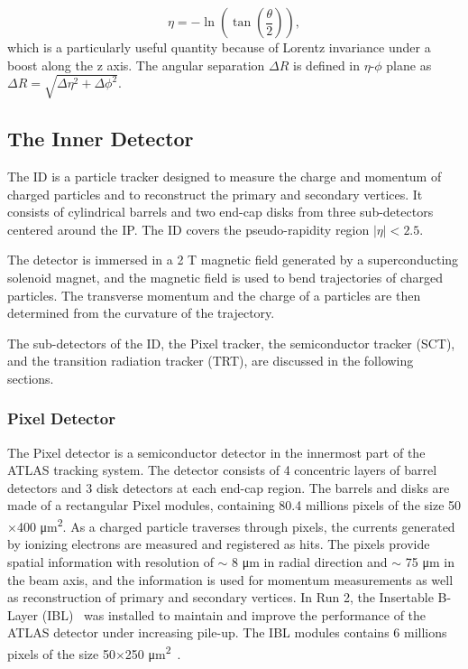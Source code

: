 \begin{equation}
    \label{eq:eta}
    \eta = -\ln (\tan (\frac{\theta}{2})),
\end{equation}
%
which is a particularly useful quantity because of Lorentz invariance under a boost along the z axis. The angular separation $\Delta R$ is defined in $\eta$-$\phi$ plane as $\Delta R = \sqrt{\Delta \eta^{2} + \Delta \phi^{2}}$.

\subsection{The Inner Detector}
\label{sec:atlas:id}
The ID is a particle tracker designed to measure the charge and momentum of charged particles and to reconstruct the primary and secondary vertices. It consists of cylindrical barrels and two end-cap disks from three sub-detectors centered around the IP. The ID covers the pseudo-rapidity region $|\eta| < 2.5$. 

The detector is immersed  in a 2 T magnetic field generated by a superconducting solenoid magnet, and the magnetic field is used to bend trajectories of charged particles. The transverse momentum and the charge of a particles are then determined from the curvature of the trajectory.

The sub-detectors of the ID, the Pixel tracker, the semiconductor tracker (SCT), and the transition radiation tracker (TRT), are discussed in the following sections.

\subsubsection{Pixel Detector}
\label{sec:atlas:pixel}

The Pixel detector is a semiconductor detector in the innermost part of the ATLAS tracking system. The detector consists of 4 concentric layers of barrel detectors and 3 disk detectors at each end-cap region. The barrels and disks are made of a rectangular Pixel modules, containing 80.4 millions pixels of the size 50$\times$400 \si{\micro\meter^{2}}. As a charged particle traverses through pixels, the currents generated by ionizing electrons are measured and registered as hits. The pixels provide spatial information with resolution of $\sim$ 8 \si{\micro\meter} in radial direction and $\sim$ 75 \si{\micro\meter} in the beam axis, and the information is used for momentum measurements as well as reconstruction of primary and secondary vertices. In Run 2, the Insertable B-Layer (IBL)~\cite{Abbott:2307576} was installed to maintain and improve the performance of the ATLAS detector under increasing pile-up. The IBL modules contains 6 millions pixels of the size 50$\times$250 \si{\micro\meter^{2}}~\cite{1748-0221-10-06-C06012}.


